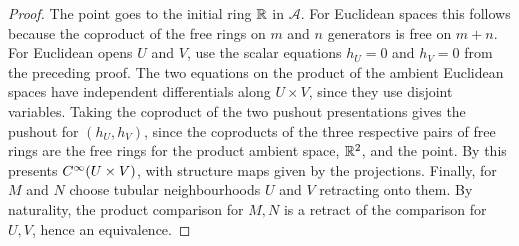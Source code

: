 \begin{proof}
  The point goes to the initial ring $\mathbb{R}$ in $\mathcal A$. For
  Euclidean spaces this follows because the coproduct
  of the free rings on $m$ and $n$ generators is free on $m+n$.
  For Euclidean opens $U$ and $V$, use the scalar equations
  $h_U=0$ and $h_V=0$ from the preceding proof. The two equations on
  the product of the ambient Euclidean spaces have independent
  differentials along $U\times V$, since they use disjoint variables.
  Taking the coproduct of the two pushout presentations gives the
  pushout for $(h_U,h_V)$, since the coproducts of the three respective
  pairs of free rings are the free rings for the product ambient
  space, $\mathbb{R}^2$, and the point. By
   this presents
  $C^\infty(U\times V)$, with structure maps given by the projections.
  Finally, for $M$ and $N$ choose tubular neighbourhoods $U$ and $V$
  retracting onto them. By naturality, the product comparison for
  $M,N$ is a retract of the comparison for $U,V$, hence an equivalence.
\end{proof}


